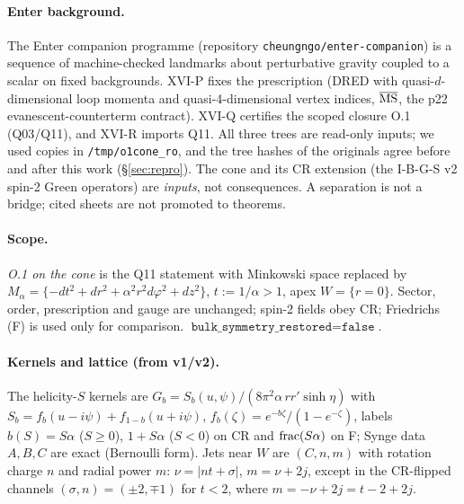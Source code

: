 \documentclass[11pt]{article}
\theoremstyle{definition}
\begin{document}
\paragraph{Enter background.} The Enter companion programme (repository \texttt{cheungngo/enter-companion}) is a sequence of machine-checked landmarks about perturbative gravity coupled to a scalar on fixed backgrounds. XVI-P fixes the prescription (DRED with quasi-$d$-dimensional loop momenta and quasi-4-dimensional vertex indices, $\overline{\rm MS}$, the p22 evanescent-counterterm contract). XVI-Q certifies the scoped closure O.1 (Q03/Q11), and XVI-R imports Q11. All three trees are read-only inputs; we used copies in \texttt{/tmp/o1cone\_ro}, and the tree hashes of the originals agree before and after this work (\S\ref{sec:repro}). The cone and its CR extension (the I-B-G-S v2 spin-2 Green operators) are \emph{inputs}, not consequences. A separation is not a bridge; cited sheets are not promoted to theorems.
\paragraph{Scope.} \emph{O.1 on the cone} is the Q11 statement with Minkowski space replaced by $M_\alpha=\{-dt^2+dr^2+\alpha^2r^2d\varphi^2+dz^2\}$, $t:=1/\alpha>1$, apex $W=\{r=0\}$. Sector, order, prescription and gauge are unchanged; spin-2 fields obey CR; Friedrichs (F) is used only for comparison. $\texttt{bulk\_symmetry\_restored}=\texttt{false}$.
\paragraph{Kernels and lattice (from v1/v2).} The helicity-$S$ kernels are $G_b=S_b(u,\psi)/(8\pi^2\alpha\,rr'\sinh\eta)$ with $S_b=f_b(u-i\psi)+f_{1-b}(u+i\psi)$, $f_b(\zeta)=e^{-b\zeta}/(1-e^{-\zeta})$, labels $b(S)=S\alpha$ ($S\ge0$), $1+S\alpha$ ($S<0$) on CR and ${\rm frac}(S\alpha)$ on F; Synge data $A,B,C$ are exact (Bernoulli form). Jets near $W$ are $(C,n,m)$ with rotation charge $n$ and radial power $m$: $\nu=|nt+\sigma|$, $m=\nu+2j$, except in the CR-flipped channels $(\sigma,n)=(\pm2,\mp1)$ for $t<2$, where $m=-\nu+2j=t-2+2j$.
\end{document}
